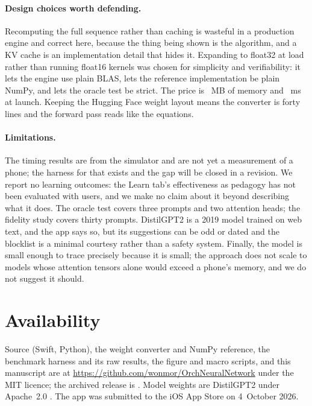 \documentclass[11pt]{article}
\begin{document}
\paragraph{Design choices worth defending.} Recomputing the full sequence rather than caching is wasteful in a production engine and correct here, because the thing being shown is the algorithm, and a KV cache is an implementation detail that hides it. Expanding to float32 at load rather than running float16 kernels was chosen for simplicity and verifiability: it lets the engine use plain BLAS, lets the reference implementation be plain NumPy, and lets the oracle test be strict. The price is \WeightFpThirtyTwoMB~MB of memory and \ExpandMsSim~ms at launch. Keeping the Hugging Face weight layout means the converter is forty lines and the forward pass reads like the equations.

\paragraph{Limitations.} The timing results are from the simulator and are not yet a measurement of a phone; the harness for that exists and the gap will be closed in a revision. We report no learning outcomes: the Learn tab's effectiveness as pedagogy has not been evaluated with users, and we make no claim about it beyond describing what it does. The oracle test covers three prompts and two attention heads; the fidelity study covers thirty prompts. DistilGPT2 is a 2019 model trained on web text, and the app says so, but its suggestions can be odd or dated and the blocklist is a minimal courtesy rather than a safety system. Finally, the model is small enough to trace precisely because it is small; the approach does not scale to models whose attention tensors alone would exceed a phone's memory, and we do not suggest it should.

\section{Availability}\label{sec:avail}
Source (Swift, Python), the weight converter and NumPy reference, the benchmark harness and its raw results, the figure and macro scripts, and this manuscript are at \url{https://github.com/wonmor/OrchNeuralNetwork} under the MIT licence; the archived release is  \citep{seong2026app}. Model weights are DistilGPT2 under Apache~2.0 \citep{sanh2019}. The app was submitted to the iOS App Store on 4~October 2026.
\end{document}
